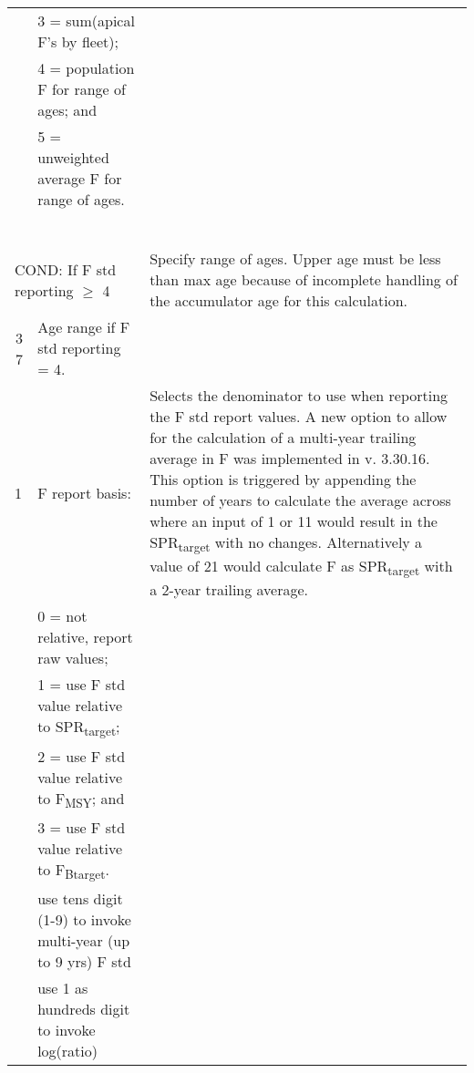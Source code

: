 {\begin{landscape}
\begin{longtable}{p{1.5cm} p{7.2cm} p{12.3cm}}
   & 3 = sum(apical F's by fleet); & \\
   & 4 = population F for range of ages; and & \\
   & 5 = unweighted average F for range of ages. & \\
   & & \\
   & & \\
   & & \\
   & & \\
   & & \\ 
   & & \\ 
  
 \hline
 \multicolumn{2}{l}{COND: If F std reporting $\geq$ 4 } & \multirow{1}{1cm}[-0.25cm]{\parbox{12.5cm}{Specify range of ages. Upper age must be less than max age because of incomplete handling of the accumulator age for this calculation.}} \Tstrut\\

 \multicolumn{1}{r}{3 7}  & Age range if F std reporting = 4. & \Tstrut\\

 \hline
 1 & F report basis: &  \multirow{1}{1cm}[-0.25cm]{\parbox{12.5cm}{Selects the denominator to use when reporting the F std report values. A new option to allow for the calculation of a multi-year trailing average in F was implemented in v. 3.30.16. This option is triggered by appending the number of years to calculate the average across where an input of 1 or 11 would result in the SPR\textsubscript{target} with no changes.  Alternatively a value of 21 would calculate F as SPR\textsubscript{target} with a 2-year trailing average.}}\Tstrut\\
   & 0 = not relative, report raw values; & \\
   & 1 = use F std value relative to SPR\textsubscript{target}; & \\
   & 2 = use F std value relative to F\textsubscript{MSY}; and & \\
   & 3 = use F std value relative to F\textsubscript{Btarget}. & \\
   & use tens digit (1-9) to invoke multi-year (up to 9 yrs) F std & \\
   & use 1 as hundreds digit to invoke log(ratio) & \Tstrut\\


\end{longtable}
\end{landscape}}
